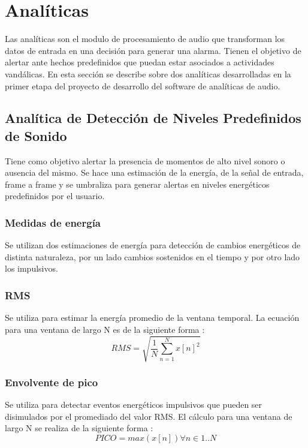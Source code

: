 \documentclass{article}
\begin{document}

\section{Analíticas}
\label{analiticas}
Las analíticas son el modulo de procesamiento de audio que transforman los datos de entrada en una decisión para generar una alarma. Tienen el objetivo de alertar ante hechos predefinidos que puedan estar asociados a actividades vandálicas. En esta sección se describe sobre dos analíticas desarrolladas en la primer etapa del proyecto de desarrollo del software de analíticas de audio. 

\subsection{Analítica de Detección de Niveles Predefinidos de Sonido}
Tiene como objetivo alertar la presencia de momentos de alto nivel sonoro o ausencia del mismo. Se hace una estimación de la energía, de la señal de entrada, frame a frame y se umbraliza para generar alertas en niveles energéticos predefinidos por el usuario.

\subsubsection{Medidas de energía}
Se utilizan dos estimaciones de energía para detección de cambios energéticos de distinta naturaleza, por un lado cambios sostenidos en el tiempo y por otro lado los impulsivos.

\subsubsection*{RMS}
Se utiliza para estimar la energía promedio de la ventana temporal. La ecuación para una ventana de largo N es de la siguiente forma \cite[Chapter~4]{Lerch:2012:IAC:2392638}:
\begin{equation}
RMS = \sqrt{\frac{1}{N}\sum_{n=1}^{N} x[n]^2}
\end{equation}

\subsubsection*{Envolvente de pico}
Se utiliza para detectar eventos energéticos impulsivos que pueden ser disimulados por el promediado del valor RMS. El cálculo para una ventana de largo N se realiza de la siguiente forma \cite[Chapter~4]{Lerch:2012:IAC:2392638}:
\begin{equation}
PICO = max(x[n])\forall n \in 1..N 
\end{equation}
\end{document}
